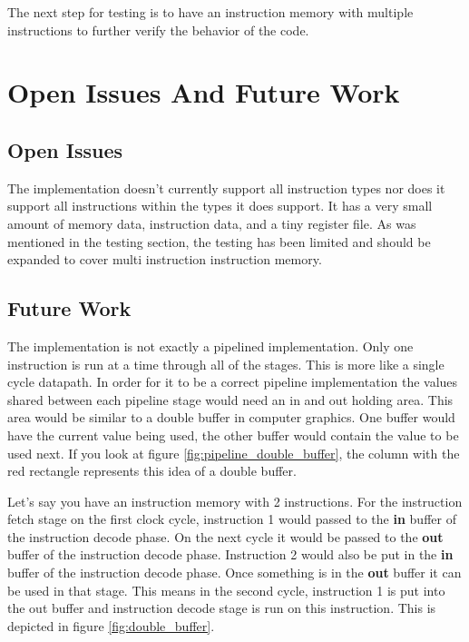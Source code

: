 \documentclass[conference]{IEEEtran}
\begin{document}
The next step for testing is to have an instruction memory with multiple instructions to further verify the behavior of the code.

\section{Open Issues And Future Work}

\subsection{Open Issues}

The implementation doesn't currently support all instruction types nor does it support all instructions within the types it does support.  It has a very small amount of memory data, instruction data, and a tiny register file.  As was mentioned in the testing section, the testing has been limited and should be expanded to cover multi instruction instruction memory.

\subsection{Future Work}

The implementation is not exactly a pipelined implementation.  Only one instruction is run at a time through all of the stages.  This is more like a single cycle datapath.  In order for it to be a correct pipeline implementation the values shared between each pipeline stage would need an in and out holding area.  This area would be similar to a double buffer in computer graphics.  One buffer would have the current value being used, the other buffer would contain the value to be used next.  If you look at figure \ref{fig:pipeline_double_buffer}, the column with the red rectangle represents this idea of a double buffer.

Let's say you have an instruction memory with 2 instructions.  For the instruction fetch stage on the first clock cycle, instruction 1 would passed to the \textbf{in} buffer of the instruction decode phase.  On the next cycle it would be passed to the \textbf{out} buffer of the instruction decode phase.  Instruction 2 would also be put in the \textbf{in} buffer of the instruction decode phase.  Once something is in the \textbf{out} buffer it can be used in that stage.  This means in the second cycle, instruction 1 is put into the out buffer and instruction decode stage is run on this instruction.  This is depicted in figure \ref{fig:double_buffer}.
\end{document}

